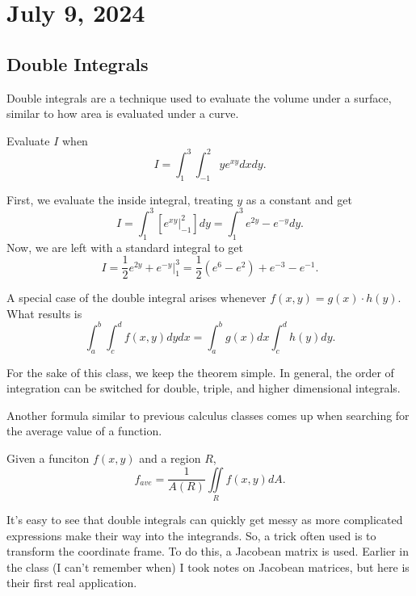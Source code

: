 \chapter{July 9, 2024}

\section{Double Integrals}

Double integrals are a technique used to evaluate the volume under a surface, similar to how area is evaluated under a curve.

\begin{example}
    Evaluate $I$ when
    \[I = \int_{1}^{3}\int_{-1}^{2}ye^{xy}dxdy.\]

    \begin{soln}
        First, we evaluate the inside integral, treating $y$ as a constant and get
        \[I = \int_{1}^{3}\left[e^{xy}\biggr\rvert_{-1}^{2}\right]dy = \int_{1}^{3}e^{2y} - e^{-y}dy.\]
        Now, we are left with a standard integral to get
        \[I = \frac{1}{2}e^{2y} + e^{-y}\biggr\rvert_{1}^{3} = \frac{1}{2}\left(e^{6} - e^{2}\right) + e^{-3} - e^{-1}.\]
    \end{soln}
\end{example}

\begin{remark}
    A special case of the double integral arises whenever $f(x, y) = g(x) \cdot h(y)$. What results is
    \[\int_{a}^{b}\int_{c}^{d}f(x, y)dydx = \int_{a}^{b}g(x)dx\int_{c}^{d}h(y)dy.\]
\end{remark}

\begin{theorem}
    For the sake of this class, we keep the theorem simple. In general, the order of integration can be switched for double, triple, and higher dimensional integrals.
\end{theorem}

Another formula similar to previous calculus classes comes up when searching for the average value of a function.

\begin{theorem}
    Given a funciton $f(x, y)$ and a region $R$,
    \[f_{ave} = \frac{1}{A(R)}\iint\limits_{R}f(x, y)dA.\]
\end{theorem}

It's easy to see that double integrals can quickly get messy as more complicated expressions make their way into the integrands. So, a trick often used is to transform the coordinate frame. To do this, a Jacobean matrix is used. Earlier in the class (I can't remember when) I took notes on Jacobean matrices, but here is their first real application.

